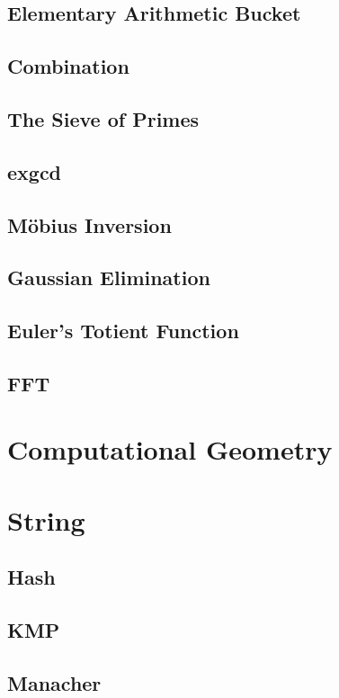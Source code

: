 \documentclass[a4paper]{article}
\begin{document}
\subsection{Elementary Arithmetic Bucket}

\subsection{Combination}

\subsection{The Sieve of Primes}
\subsection{exgcd}
\subsection{Möbius Inversion}
\subsection{Gaussian Elimination}
\subsection{Euler's Totient Function}
\subsection{FFT}

\section{Computational Geometry}


\pagebreak

\section{String}
\subsection{Hash}
\subsection{KMP}
\subsection{Manacher}
\end{document}

